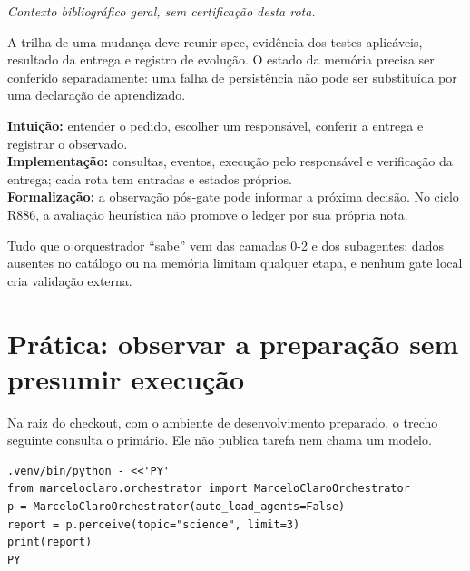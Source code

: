 \noindent\textit{Contexto bibliográfico geral, sem certificação desta rota.} 


\begin{resultado}
A trilha de uma mudança deve reunir spec, evidência dos testes aplicáveis,
resultado da entrega e registro de evolução. O estado da memória precisa ser
conferido separadamente: uma falha de persistência não pode ser substituída por
uma declaração de aprendizado.
\end{resultado}

\begin{niveis}
\textbf{Intuição:} entender o pedido, escolher um responsável, conferir a entrega e registrar o observado.\\
\textbf{Implementação:} consultas, eventos, execução pelo responsável e
verificação da entrega; cada rota tem entradas e estados próprios.\\
\textbf{Formalização:} a observação pós-gate pode informar a próxima decisão.
No ciclo R886, a avaliação heurística não promove o ledger por sua própria nota.
\end{niveis}

\begin{limite}
Tudo que o orquestrador ``sabe'' vem das camadas 0-2 e dos subagentes: dados
ausentes no catálogo ou na memória limitam qualquer etapa, e nenhum gate local cria
validação externa.
\end{limite}


\section{Prática: observar a preparação sem presumir execução}

Na raiz do checkout, com o ambiente de desenvolvimento preparado, o trecho
seguinte consulta o primário. Ele não publica tarefa nem chama um modelo.
\begin{verbatim}
.venv/bin/python - <<'PY'
from marceloclaro.orchestrator import MarceloClaroOrchestrator
p = MarceloClaroOrchestrator(auto_load_agents=False)
report = p.perceive(topic="science", limit=3)
print(report)
PY
\end{verbatim}

